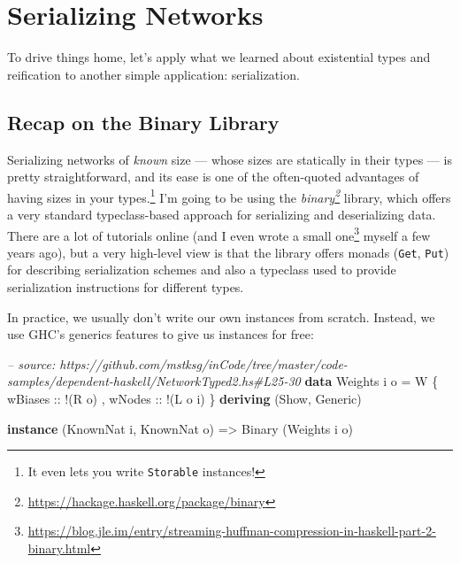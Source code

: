 \documentclass[]{article}
\newenvironment{Shaded}{}{}
\newcommand{\KeywordTok}[1]{\textcolor[rgb]{0.00,0.44,0.13}{\textbf{{#1}}}}
\newcommand{\DataTypeTok}[1]{\textcolor[rgb]{0.56,0.13,0.00}{{#1}}}
\newcommand{\CommentTok}[1]{\textcolor[rgb]{0.38,0.63,0.69}{\textit{{#1}}}}
\newcommand{\OtherTok}[1]{\textcolor[rgb]{0.00,0.44,0.13}{{#1}}}
\newcommand{\FunctionTok}[1]{\textcolor[rgb]{0.02,0.16,0.49}{{#1}}}
\newcommand{\NormalTok}[1]{{#1}}
\renewcommand{\href}[2]{#2\footnote{\url{#1}}}
\begin{document}
\section{Serializing Networks}\label{serializing-networks}

To drive things home, let's apply what we learned about existential types and
reification to another simple application: serialization.

\subsection{Recap on the Binary Library}\label{recap-on-the-binary-library}

Serializing networks of \emph{known} size --- whose sizes are statically in
their types --- is pretty straightforward, and its ease is one of the
often-quoted advantages of having sizes in your types.\footnote{It even lets you
  write \texttt{Storable} instances!} I'm going to be using the
\emph{\href{https://hackage.haskell.org/package/binary}{binary}} library, which
offers a very standard typeclass-based approach for serializing and
deserializing data. There are a lot of tutorials online (and I even
\href{https://blog.jle.im/entry/streaming-huffman-compression-in-haskell-part-2-binary.html}{wrote
a small one} myself a few years ago), but a very high-level view is that the
library offers monads (\texttt{Get}, \texttt{Put}) for describing serialization
schemes and also a typeclass used to provide serialization instructions for
different types.

In practice, we usually don't write our own instances from scratch. Instead, we
use GHC's generics features to give us instances for free:

\begin{Shaded}
\begin{Highlighting}[]
\CommentTok{-- source: https://github.com/mstksg/inCode/tree/master/code-samples/dependent-haskell/NetworkTyped2.hs#L25-30}
\KeywordTok{data} \DataTypeTok{Weights} \NormalTok{i o }\FunctionTok{=} \DataTypeTok{W} \NormalTok{\{}\OtherTok{ wBiases ::} \FunctionTok{!}\NormalTok{(}\DataTypeTok{R} \NormalTok{o)}
                     \NormalTok{,}\OtherTok{ wNodes  ::} \FunctionTok{!}\NormalTok{(}\DataTypeTok{L} \NormalTok{o i)}
                     \NormalTok{\}}
  \KeywordTok{deriving} \NormalTok{(}\DataTypeTok{Show}\NormalTok{, }\DataTypeTok{Generic}\NormalTok{)}

\KeywordTok{instance} \NormalTok{(}\DataTypeTok{KnownNat} \NormalTok{i, }\DataTypeTok{KnownNat} \NormalTok{o) }\OtherTok{=>} \DataTypeTok{Binary} \NormalTok{(}\DataTypeTok{Weights} \NormalTok{i o)}
\end{Highlighting}
\end{Shaded}
\end{document}
